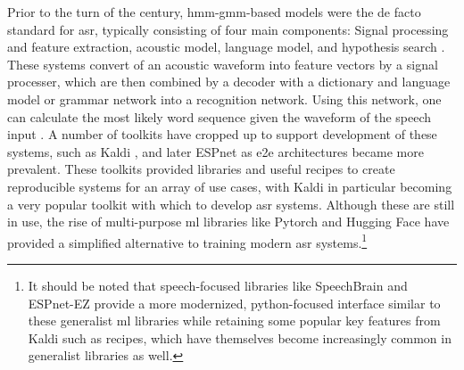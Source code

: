 \documentclass[thesis]{cluu}
\begin{document}
Prior to the turn of the century, \gls{hmm}-\gls{gmm}-based models were the de facto standard for \gls{asr}, typically consisting of four main components: Signal processing and feature extraction, acoustic model, language model, and hypothesis search \parencite{yuAutomaticSpeechRecognition2015}. These systems convert of an acoustic waveform into feature vectors by a signal processer, which are then combined by a decoder with a dictionary and language model or grammar network into a recognition network. Using this network, one can calculate the most likely word sequence given the waveform of the speech input \parencite{witt2000use}. A number of toolkits have cropped up to support development of these systems, such as Kaldi \parencite{poveyKaldiSpeechRecognition}, and later ESPnet \parencite{watanabeESPnetEndtoEndSpeech2018} as \gls{e2e} architectures became more prevalent. These toolkits provided libraries and useful recipes to create reproducible systems for an array of use cases, with Kaldi in particular becoming a very popular toolkit with which to develop \gls{asr} systems. Although these are still in use, the rise of multi-purpose \gls{ml} libraries like Pytorch \parencite{paszkePyTorchImperativeStyle2019} and Hugging Face \parencite{wolfTransformersStateoftheArtNatural2020} have provided a simplified alternative to training modern \gls{asr} systems.\footnote{It should be noted that speech-focused libraries like SpeechBrain \parencite{speechbrain} and ESPnet-EZ \parencite{somekiESPnetEZPythononlyESPnet2024} provide a more modernized, python-focused interface similar to these generalist \gls{ml} libraries while retaining some popular key features from Kaldi such as recipes, which have themselves become increasingly common in generalist libraries as well.} 
\end{document}
